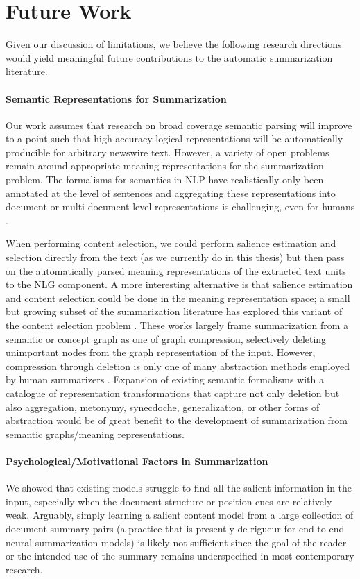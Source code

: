 \section{Future Work}

Given our discussion of limitations, we believe the following research
directions would yield meaningful future contributions to the automatic
summarization literature.

\paragraph{Semantic Representations for Summarization}

Our work assumes that research on broad coverage semantic parsing will improve
to a point such that high accuracy logical representations will be
automatically producible for arbitrary newswire text.  However, a variety of
open problems remain around appropriate meaning representations for the
summarization problem.  The formalisms for semantics in NLP have realistically
only been annotated at the level of sentences and aggregating these
representations into document or multi-document level representations is
challenging, even for humans \citep{ogorman2018}. 

When performing content selection, we could perform salience estimation and
selection directly from the text (as we currently do in this thesis) but then
pass on the automatically parsed meaning representations of the extracted text
units to the NLG component.  A more interesting alternative is that salience
estimation and content selection could be done in the meaning representation
space; a small but growing subset of the summarization literature has explored
this variant of the content selection problem
\citep{falke2017,liao2018,falke2019}.  These works largely frame summarization
from a semantic or concept graph as one of graph compression, selectively
deleting unimportant nodes from the graph representation of the input. However,
compression through deletion is only one of many abstraction methods employed
by human summarizers \citep{jing2000b}.  Expansion of existing semantic
formalisms with a  catalogue of representation transformations that capture not
only deletion but also aggregation, metonymy, synecdoche, generalization, or
other forms of abstraction would be of great benefit to the development of
summarization from semantic graphs/meaning representations.

\paragraph{Psychological/Motivational Factors in Summarization} We showed that
existing models struggle to find all the salient information in the input,
especially when the document structure or position cues are relatively weak.
Arguably, simply learning a salient content model from a large collection of
document-summary pairs (a practice that is presently de rigueur for end-to-end
neural summarization models) is likely not sufficient since the goal of the
reader or the intended use of the summary remains underspecified in most
contemporary research. 

